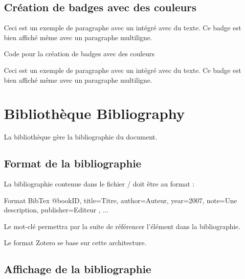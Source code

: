 {\section{Création de badges avec des couleurs}


Ceci est un exemple de paragraphe avec un  intégré 
avec du texte. Ce badge est bien affiché même avec un paragraphe multiligne.\\


\begin{Latex}{Code pour la création de badges avec des couleurs}

Ceci est un exemple de paragraphe avec un  intégré avec du texte. Ce badge est bien affiché même avec un paragraphe multiligne.

\end{Latex}

\chapter{Bibliothèque Bibliography}
\label{biblio}

La bibliothèque  gère la bibliographie du document.

\section{Format de la bibliographie}

La bibliographie contenue dans le fichier / doit être au format  : \\

\begin{Bash}{Format BibTex}
    @book{ID,
    title={Titre},
    author={Auteur},
    year={2007},
    note={Une description},
    publisher={Editeur}
},
 ...
\end{Bash}

Le mot-clé  permettra par la suite de référencer l'élément dans la bibliographie.


Le format Zotero se base sur cette architecture.

\section{Affichage de la bibliographie}

}
